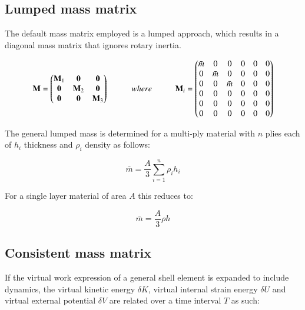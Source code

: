 \subsection{Lumped mass matrix}
The default mass matrix employed is a lumped approach, which results in a diagonal mass matrix that ignores rotary inertia.

\begin{equation} 
\mathbf{M} =  
\begin{pmatrix}
\mathbf{M}_1 & \mathbf{0} & \mathbf{0}\\
\mathbf{0} & \mathbf{M}_2 & \mathbf{0}\\
\mathbf{0} & \mathbf{0} & \mathbf{M}_3
\end{pmatrix}
\hspace{10mm}
where
\hspace{10mm}
\mathbf{M}_i =  
\begin{pmatrix}
\bar{m} & 0 & 0 & 0 & 0 & 0\\
0 & \bar{m} & 0 & 0 & 0 & 0\\
0 & 0 & \bar{m} &0 & 0 & 0\\
0 & 0 & 0 & 0 & 0 & 0\\
0 & 0 & 0 & 0 & 0 & 0\\
0 & 0 & 0 & 0 & 0 & 0
\end{pmatrix}
\label{eqt15}
\end{equation}

The general lumped mass is determined for a multi-ply material with $n$ plies each of $h_i$ thickness and $\rho_i$ density as follows:

\begin{equation} 
\bar{m} = \frac{A}{3} \sum_{i=1}^n \rho_i h_i
\label{eqt16}
\end{equation}

For a single layer material of area $A$ this reduces to:

\begin{equation} 
\bar{m} = \frac{A}{3} \rho h
\label{eqt17}
\end{equation}

\subsection{Consistent mass matrix}
If the virtual work expression of a general shell element is expanded to include dynamics, the virtual kinetic energy $\delta K$, virtual internal strain energy $\delta U$ and virtual external potential $\delta V$ are related over a time interval $T$ as such:

